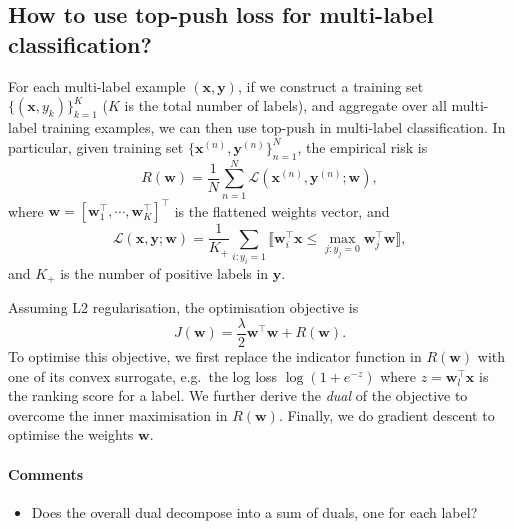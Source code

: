 \documentclass[9pt]{extarticle}
\newcommand{\llb}{\llbracket}
\newcommand{\rrb}{\rrbracket}
\newcommand{\x}{\mathbf{x}}
\newcommand{\y}{\mathbf{y}}
\newcommand{\1}{\mathbf{1}}
\newcommand{\w}{\mathbf{w}}
\newcommand{\LCal}{\mathcal{L}}
\newcommand{\pb}[1]{^{({#1})}}
\newcommand{\eg}{e.g.\ }
\begin{document}
\subsection*{How to use top-push loss for multi-label classification?}

For each multi-label example $(\x, \y)$, if we construct a training set $\{(\x, y_k)\}_{k=1}^K$ ($K$ is the total number of labels),
and aggregate over all multi-label training examples, we can then use top-push in multi-label classification. 
In particular, given training set $\{\x\pb{n}, \y\pb{n}\}_{n=1}^N$, the empirical risk is
\begin{equation*}
R(\w) = \frac{1}{N} \sum_{n=1}^N \LCal(\x\pb{n}, \y\pb{n}; \w),
\end{equation*}
where $\w = [\w_1^\top, \cdots, \w_K^\top]^\top$ is the flattened weights vector, and
\begin{equation}
\label{eq:top-push_loss}
\LCal(\x, \y; \w) = \frac{1}{K_+} \sum_{i:y_i=1} \llb \w_i^\top \x \le \underset{j:y_j=0}{\max} \w_j^\top \w \rrb,
\end{equation}
and $K_+$ is the number of positive labels in $\y$.


Assuming L2 regularisation, the optimisation objective is
\begin{equation*}
J(\w) = \frac{\lambda}{2}\w^\top \w + R(\w).
\end{equation*}
To optimise this objective, we first replace the indicator function in $R(\w)$ with one of its convex surrogate, 
\eg the log loss $\log(1+e^{-z})$ where $z = \w_l^\top \x$ is the ranking score for a label.
We further derive the \emph{dual} of the objective to overcome the inner maximisation in $R(\w)$.
Finally, we do gradient descent to optimise the weights $\w$.

\paragraph{Comments}
{\it
\begin{itemize}
\item Does the overall dual decompose into a sum of duals, one for each label?
\end{itemize}
}
\end{document}
